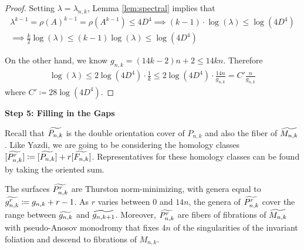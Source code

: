 \begin{proof}
Setting $\lambda = \lambda_{n,k}$, Lemma \ref{lem:spectral} implies that
\begin{gather*}
    \lambda^{k-1} = \rho(A)^{k-1} = \rho(A^{k-1}) \leq 4D^4 \implies (k-1)\cdot \log(\lambda) \leq \log(4D^4) \\
    \implies \frac{k}{2}\log(\lambda) \leq (k-1)\log(\lambda) \leq \log(4D^4)
\end{gather*}

On the other hand, we know $g_{n,k} = (14k - 2)n + 2 \leq 14kn$. Therefore
\begin{align*}
    \log(\lambda) \leq 2\log(4D^4)\cdot\frac{1}{k} \leq 2\log(4D^4)\cdot \frac{14n}{g_{n,k}} = C'\frac{n}{g_{n,k}}
\end{align*}
where $C' \coloneqq 28\log(4D^4)$.
\end{proof}

\begin{center}
\textbf{Step 5: Filling in the Gaps}    
\end{center}

Recall that $\widetilde{P_{n,k}}$ is the double orientation cover of $P_{n,k}$ and also the fiber of $\widetilde{M_{n,k}}$. Like Yazdi, we are going to be considering the homology classes $[\widetilde{P^r_{n,k}}] \coloneqq [\widetilde{P_{n,k}}] + r[\widetilde{F_{n,k}}]$. Representatives for these homology classes can be found by taking the oriented sum.

\begin{lem}
The surfaces $\widetilde{P^r_{n,k}}$ are Thurston norm-minimizing, with genera equal to $\widetilde{g^r_{n,k}} \coloneqq g_{n,k} + r - 1$. As $r$ varies between $0$ and $14n$, the genera of $\widetilde{P^r_{n,k}}$ cover the range between $\widetilde{g_{n,k}}$ and $\widetilde{g_{n,k+1}}$. Moreover, $\widetilde{P^r_{n,k}}$ are fibers of fibrations of $\widetilde{M_{n,k}}$ with pseudo-Anosov monodromy that fixes $4n$ of the singularities of the invariant foliation and descend to fibrations of $M_{n,k}$.
\end{lem}

